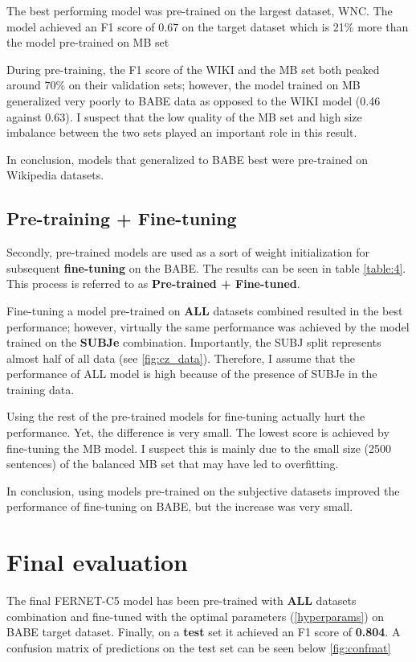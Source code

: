 The best performing model was pre-trained on the largest dataset, WNC. The model achieved an F1 score of 0.67 on the target dataset which is 21\% more than the model pre-trained on MB set

During pre-training, the F1 score of the WIKI and the MB set both peaked around 70\% on their validation sets; however, the model trained on MB generalized very poorly to BABE data as opposed to the WIKI model (0.46 against 0.63). I suspect that the low quality of the MB set and high size imbalance between the two sets played an important role in this result.

In conclusion, models that generalized to BABE best were pre-trained on Wikipedia datasets.

\subsection{Pre-training + Fine-tuning}
Secondly, pre-trained models are used as a sort of weight initialization for subsequent \textbf{fine-tuning} on the BABE. The results can be seen in table \ref{table:4}. This process is referred to as \textbf{Pre-trained + Fine-tuned}.

Fine-tuning a model pre-trained on \textbf{ALL} datasets combined resulted in the best performance; however, virtually the same performance was achieved by the model trained on the \textbf{SUBJe} combination. Importantly, the SUBJ split represents almost half of all data (see \ref{fig:cz_data}). Therefore, I assume that the performance of ALL model is high because of the presence of SUBJe in the training data.

Using the rest of the pre-trained models for fine-tuning actually hurt the performance. Yet, the difference is very small. The lowest score is achieved by fine-tuning the MB model. I suspect this is mainly due to the small size (2500 sentences) of the balanced MB set that may have led to overfitting.

In conclusion, using models pre-trained on the subjective datasets improved the performance of fine-tuning on BABE, but the increase was very small.




\section{Final evaluation}\label{classifier}
The final FERNET-C5 model has been pre-trained with \textbf{ALL} datasets combination and fine-tuned with the optimal parameters (\ref{hyperparams}) on BABE target dataset. Finally, on a \textbf{test} set it achieved an F1 score of \textbf{0.804}. A confusion matrix of predictions on the test set can be seen below \ref{fig:confmat}

